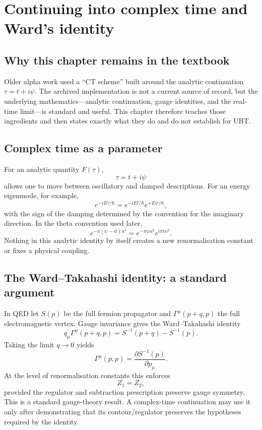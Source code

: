 
\chapter{Continuing into complex time and Ward's identity}
\label{ch:ct-scheme}

\section{Why this chapter remains in the textbook}
Older alpha work used a ``CT scheme'' built around the analytic continuation
\(\tau=t+i\psi\).  The archived implementation is not a current source of
record, but the underlying mathematics---analytic continuation, gauge
identities, and the real-time limit---is standard and useful.  This chapter
therefore teaches those ingredients and then states exactly what they do and do
not establish for UBT.

\section{Complex time as a parameter}
For an analytic quantity $F(\tau)$,
\[
 \tau=t+i\psi
\]
allows one to move between oscillatory and damped descriptions.  For an energy
eigenmode, for example,
\[
 e^{-iE\tau/\hbar}=e^{-iEt/\hbar}e^{+E\psi/\hbar},
\]
with the sign of the damping determined by the convention for the imaginary
direction.  In the theta convention used later,
\[
 e^{-\pi(\psi-it)n^2}
 =e^{-\pi\psi n^2}e^{i\pi t n^2}.
\]
Nothing in this analytic identity by itself creates a new renormalisation
constant or fixes a physical coupling.

\section{The Ward--Takahashi identity: a standard argument}
In QED let $S(p)$ be the full fermion propagator and
$\Gamma^\mu(p+q,p)$ the full electromagnetic vertex.  Gauge invariance gives
the Ward--Takahashi identity
\[
 q_\mu\Gamma^\mu(p+q,p)
 =S^{-1}(p+q)-S^{-1}(p).
\]
Taking the limit $q\to0$ yields
\[
 \Gamma^\mu(p,p)=\frac{\partial S^{-1}(p)}{\partial p_\mu}.
\]
At the level of renormalisation constants this enforces
\[
 \boxed{Z_1=Z_2,}
\]
provided the regulator and subtraction prescription preserve gauge symmetry.
This is a standard gauge-theory result.  A complex-time continuation may use
it only after demonstrating that its contour/regulator preserves the hypotheses
required by the identity.

